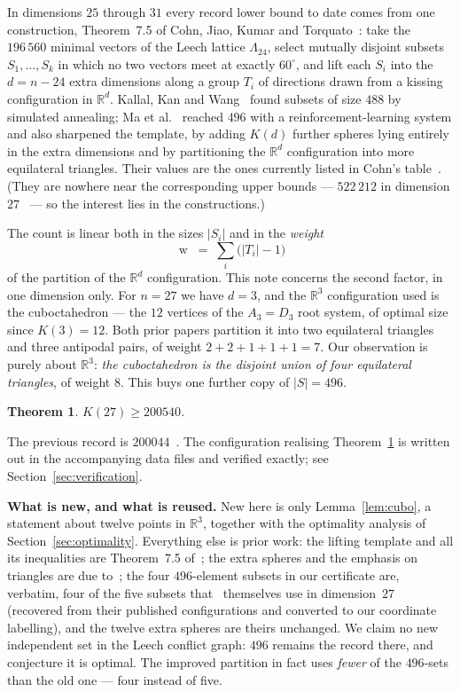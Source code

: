 \documentclass[11pt,reqno]{amsart}
\theoremstyle{plain}
\newtheorem{theorem}{Theorem}
\theoremstyle{remark}
\newcommand{\R}{\mathbb{R}}
\newcommand{\Lat}{\Lambda_{24}}
\DeclareMathOperator{\wt}{w}
\begin{document}
In dimensions $25$ through $31$ every record lower bound to date comes from one
construction, Theorem~7.5 of Cohn, Jiao, Kumar and Torquato~\cite{CJKT2011}: take
the $196\,560$ minimal vectors of the Leech lattice $\Lat$, select mutually
disjoint subsets $S_{1},\dots,S_{k}$ in which no two vectors meet at exactly
$60^{\circ}$, and lift each $S_{i}$ into the $d = n-24$ extra dimensions along a
group $T_{i}$ of directions drawn from a kissing configuration in $\R^{d}$.
Kallal, Kan and Wang~\cite{KKW2017} found subsets of size $488$ by simulated
annealing; Ma et al.~\cite{Ma2025} reached $496$ with a reinforcement-learning
system and also sharpened the template, by adding $K(d)$ further spheres lying
entirely in the extra dimensions and by partitioning the $\R^{d}$ configuration
into more equilateral triangles.  Their values are the ones currently listed in
Cohn's table~\cite{CohnTable}.  (They are nowhere near the corresponding upper
bounds --- $522\,212$ in dimension $27$~\cite{dLL2024} --- so the interest lies in
the constructions.)

The count is linear both in the sizes $|S_{i}|$ and in the \emph{weight}
\begin{equation}\label{eq:weight}
  \wt \;=\; \sum_{i} \bigl(|T_{i}| - 1\bigr)
\end{equation}
of the partition of the $\R^{d}$ configuration.  This note concerns the second
factor, in one dimension only.  For $n = 27$ we have $d = 3$, and the $\R^{3}$
configuration used is the cuboctahedron --- the $12$ vertices of the
$A_{3} = D_{3}$ root system, of optimal size since $K(3) = 12$.  Both prior papers
partition it into two equilateral triangles and three antipodal pairs, of weight
$2+2+1+1+1 = 7$.  Our observation is purely about $\R^{3}$: \emph{the
cuboctahedron is the disjoint union of four equilateral triangles}, of weight
$8$.  This buys one further copy of $|S| = 496$.

\begin{theorem}\label{thm:main}
$K(27) \ge 200540$.
\end{theorem}

The previous record is $200044$~\cite{Ma2025,CohnTable}.  The configuration
realising Theorem~\ref{thm:main} is written out in the accompanying data files
and verified exactly; see Section~\ref{sec:verification}.

\medskip
\noindent\textbf{What is new, and what is reused.}  New here is only
Lemma~\ref{lem:cubo}, a statement about twelve points in $\R^{3}$, together with
the optimality analysis of Section~\ref{sec:optimality}.  Everything else is
prior work: the lifting template and all its inequalities are Theorem~7.5
of~\cite{CJKT2011}; the extra spheres and the emphasis on triangles are due
to~\cite{Ma2025}; the four $496$-element subsets in our certificate are, verbatim,
four of the five subsets that~\cite{Ma2025} themselves use in dimension~$27$
(recovered from their published configurations and converted to our coordinate
labelling), and the twelve extra spheres are theirs unchanged.  We claim no new
independent set in the Leech conflict graph: $496$ remains the record there,
and~\cite{Ma2025} conjecture it is optimal.  The improved partition in fact uses
\emph{fewer} of the $496$-sets than the old one --- four instead of five.
\end{document}
